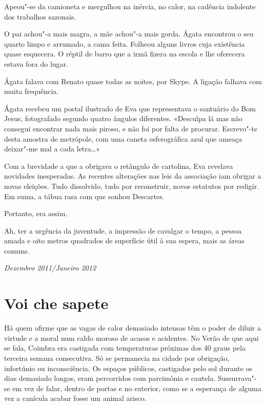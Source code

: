 Apeou"-se da camioneta e mergulhou na inércia, no calor,
na cadência indolente dos trabalhos sazonais.

O pai achou"-a mais magra, a mãe achou"-a mais gorda. Ágata encontrou o
seu quarto limpo e arrumado, a cama feita. Folheou alguns livros cuja
existência quase esquecera. O réptil de barro que a irmã fizera na
escola e lhe oferecera estava fora do lugar.

Ágata falava com Renato quase todas as noites, por Skype.
A ligação falhava com muita frequência.

Ágata recebeu um postal ilustrado de Eva que representava o santuário
do Bom Jesus, fotografado segundo quatro ângulos diferentes. «Desculpa
lá mas não consegui encontrar nada mais piroso, e não foi por falta de
procurar. Escrevo"-te desta amostra de metrópole, com uma caneta esferográfica azul que
ameaça deixar"-me mal a cada letra\ldots{}»

Com a brevidade a que a obrigava o retângulo de cartolina, Eva
revelava novidades inesperadas. As recentes alterações nas leis da
associação iam obrigar a novas eleições. Tudo dissolvido, tudo por
reconstruir, novos estatutos por redigir. Em suma, a tábua rasa com que
sonhou Descartes.

Portanto, era assim.

Ah, ter a urgência da juventude, a impressão de cavalgar o tempo, a
pessoa amada e oito metros quadrados de superfície útil à sua espera,
mais as áreas comuns.

\begin{flushright}
\emph{Dezembro 2011/Janeiro 2012}
\end{flushright}

\chapter{Voi che sapete}

Há quem afirme que as vagas de calor demasiado intensas têm o poder de
diluir a virtude e a moral num caldo moroso de acasos e acidentes. No
Verão de que aqui se fala, Coimbra era castigada com temperaturas
próximas dos 40 graus pela terceira semana consecutiva. Só se permanecia
na cidade por obrigação, infortúnio ou inconsciência. Os espaços
públicos, castigados pelo sol durante os dias demasiado longos, eram
percorridos com parcimônia e cautela. Sussurrava"-se em vez de falar,
dentro de portas e no exterior, como se a esperança de alguma vez a
canícula acabar fosse um animal arisco.

